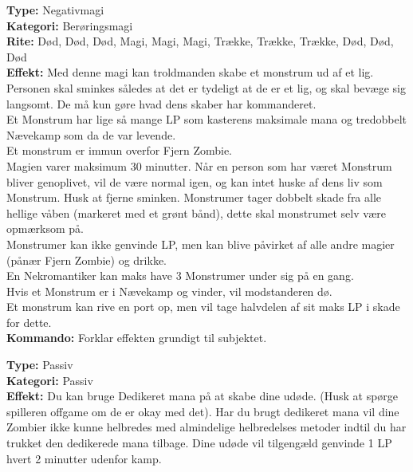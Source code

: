 \begin{zombie*}
\textbf{Type:} Negativmagi\\
\textbf{Kategori:} Berøringsmagi\\
\textbf{Rite:} Død, Død, Død, Magi, Magi, Magi, Trække, Trække, Trække, Død, Død, Død\\
\textbf{Effekt:} Med denne magi kan troldmanden skabe et monstrum ud af et lig. Personen skal sminkes således at det er tydeligt at de er et lig, og skal bevæge sig langsomt. De må kun gøre hvad dens skaber har kommanderet.\\
Et Monstrum har lige så mange LP som kasterens maksimale mana og tredobbelt Nævekamp som da de var levende.\\
Et monstrum er immun overfor Fjern Zombie.\\
Magien varer maksimum 30 minutter. Når en person som har været Monstrum bliver genoplivet, vil de være normal igen, og kan intet huske af dens liv som Monstrum. Husk at fjerne sminken. Monstrumer tager dobbelt skade fra alle hellige våben (markeret med et grønt bånd), dette skal monstrumet selv være opmærksom på.\\ 
Monstrumer kan ikke genvinde LP, men kan blive påvirket af alle andre magier (pånær Fjern Zombie) og drikke.\\
En Nekromantiker kan maks have 3 Monstrumer under sig på en gang. \\
Hvis et Monstrum er i Nævekamp og vinder, vil modstanderen dø.\\
Et monstrum kan rive en port op, men vil tage halvdelen af sit maks LP i skade for dette.\\
\textbf{Kommando:} Forklar effekten grundigt til subjektet.\\
\end{zombie*}


\begin{zombie*}
\textbf{Type:} Passiv\\
\textbf{Kategori:} Passiv\\
\textbf{Effekt:} Du kan bruge Dedikeret mana på at skabe dine udøde. (Husk at spørge spilleren offgame om de er okay med det). Har du brugt dedikeret mana vil dine Zombier ikke kunne helbredes med almindelige helbredelses metoder indtil du har trukket den dedikerede mana tilbage. Dine udøde vil tilgengæld genvinde 1 LP hvert 2 minutter udenfor kamp.
\end{zombie*}

